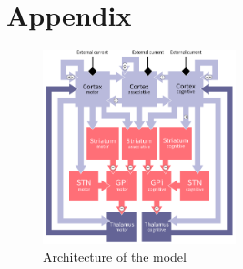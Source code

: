 
\section*{Appendix}

\begin{figure}[h]
  \centering \includegraphics[width=0.5\textwidth]{architecture}
  \caption{Architecture of the model}
  \label{fig:architecture}
\end{figure}



